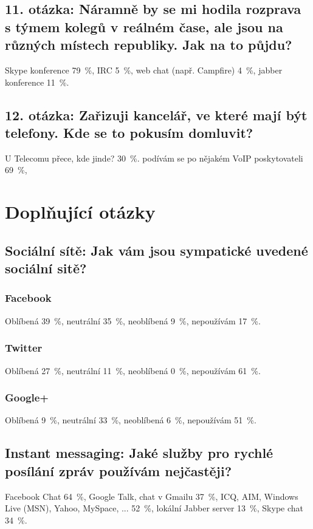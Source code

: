 \documentclass[12pt,oneside,final]{fithesis2}
\begin{document}
\subsection*{11. otázka: Náramně by se mi hodila rozprava s týmem kolegů v reálném čase, ale jsou na různých místech republiky. Jak na to půjdu?}
Skype konference 79~\%,
IRC 5~\%,
web chat (např. Campfire) 4~\%,
jabber konference 11~\%.

\subsection*{12. otázka: Zařizuji kancelář, ve které mají být telefony. Kde se to pokusím domluvit?}
U Telecomu přece, kde jinde? 30~\%.
podívám se po nějakém VoIP poskytovateli 69~\%,


\section{Doplňující otázky}

\subsection*{Sociální sítě: Jak vám jsou sympatické uvedené sociální sitě?}
\subsubsection*{Facebook}
Oblíbená 39~\%,
neutrální 35~\%,
neoblíbená 9~\%,
nepoužívám 17~\%.

\subsubsection*{Twitter}
Oblíbená 27~\%,
neutrální 11~\%,
neoblíbená 0~\%,
nepoužívám 61~\%.

\subsubsection*{Google+}
Oblíbená 9~\%,
neutrální 33~\%,
neoblíbená 6~\%,
nepoužívám 51~\%.

\subsection*{Instant messaging: Jaké služby pro rychlé posílání zpráv používám nejčastěji?}
Facebook Chat 64~\%,
Google Talk, chat v Gmailu 37~\%,
ICQ, AIM, Windows Live (MSN), Yahoo, MySpace, ... 52~\%,
lokální Jabber server 13~\%,
Skype chat 34~\%.
\end{document}
